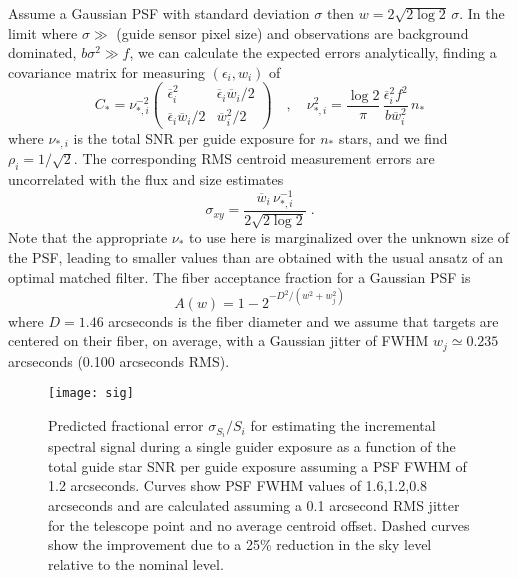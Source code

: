 \documentclass[11pt]{article}
\begin{document}
Assume a Gaussian PSF with standard deviation $\sigma$ then $w = 2\sqrt{2\log 2}\,\sigma$. In the limit where $\sigma \gg$ (guide sensor pixel size) and observations are background dominated, $b \sigma^2 \gg f$, we can calculate the expected errors analytically, finding a covariance matrix for measuring $(\epsilon_i,w_i)$ of
\begin{equation}
C_{\ast} = \nu_{\ast,i}^{-2}\begin{pmatrix}
\overline{\epsilon}_i^2 & \overline{\epsilon}_i \overline{w}_i/2\\
\overline{\epsilon}_i \overline{w}_i/2 & \overline{w}_i^2/2
\end{pmatrix}\quad, \quad
\nu_{\ast,i}^2 = \frac{\log 2}{\pi}\, \frac{\overline{\epsilon}_i^2 f^2}{b \overline{w}_i^2}\, n_{\ast}
\end{equation}
where $\nu_{\ast,i}$ is the total SNR per guide exposure for $n_{\ast}$ stars, and we find $\rho_i = 1/\sqrt{2}$. The corresponding RMS centroid measurement errors are uncorrelated with the flux and size estimates
\begin{equation}
\sigma_{xy} = \frac{\overline{w}_i\,\nu_{\ast,i}^{-1}}{2\sqrt{2\log 2}} \; .
\end{equation}
Note that the appropriate $\nu_\ast$ to use here is marginalized over the unknown size of the PSF, leading to smaller values than are obtained with the usual ansatz of an optimal matched filter. The fiber acceptance fraction for a Gaussian PSF is
\begin{equation}
A(w) = 1 - 2^{-D^2/(w^2+w_j^2)}
\end{equation}
where $D = 1.46$ arcseconds is the fiber diameter and we assume that targets are centered on their fiber, on average, with a Gaussian jitter of FWHM $w_j \simeq 0.235$ arcseconds (0.100 arcseconds RMS).

\begin{figure}[htb]
\begin{center}
\texttt{[image: sig]}
\caption{Predicted fractional error $\sigma_{S_i}/S_i$ for estimating the incremental spectral signal during a single guider exposure as a function of the total guide star SNR per guide exposure assuming a PSF FWHM of 1.2 arcseconds. Curves show PSF FWHM values of 1.6,1.2,0.8 arcseconds and are calculated assuming a 0.1 arcsecond RMS jitter for the telescope point and no average centroid offset. Dashed curves show the improvement due to a 25\% reduction in the sky level relative to the nominal level.}
\label{fig:sigpar}
\end{center}
\end{figure}
\end{document}
